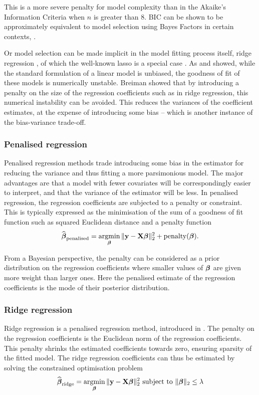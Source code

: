 \noindent This is a more severe penalty for model complexity than in the
Akaike's Information Criteria when $n$ is greater than $8$. BIC can be shown to
be approximately equivalent to model selection using Bayes Factors in certain
contexts, \cite{Kass1993}.

Or model selection can be made implicit in the model fitting process itself,
ridge regression \citep{Casella1980}, of which the well-known lasso is a special
case \citep{Tibshirani1996}. As \citep{Breiman1996} and \citep{Efron2013}
showed, while  the standard formulation of a linear model is unbiased, the
goodness of fit of these models is numerically  unstable. Breiman showed that by
introducing a penalty on the size of the regression coefficients such as  in
ridge regression, this numerical instability can be avoided. This reduces the
variances of the coefficient estimates, at the expense of introducing some bias
-- which is another instance of the bias-variance trade-off.

\subsubsection{Penalised regression}

Penalised regression methods trade introducing some bias in the estimator for
reducing the variance and thus fitting a more parsimonious model. The major
advantages are that a model with fewer covariates will be correspondingly easier
to interpret, and that the variance of the estimator will be less. In penalised
regression, the regression coefficients are subjected to a penalty or
constraint. This is typically expressed as the minimisation of the sum of a
goodness of fit function such as squared Euclidean distance and a penalty
function
$$
\widehat{\vbeta}_{\text{penalised}} = \argmin_\vbeta \|\vy - \mX \vbeta\|_2^2 + \text{penalty}(\vbeta).
$$

From a Bayesian perspective, the penalty can be considered as a prior
distribution on the regression coefficients where smaller values of ${\boldsymbol \beta}$ are
given more weight than larger ones. Here the penalised estimate of the
regression coefficients is the mode of their posterior distribution.

\subsubsection{Ridge regression}

Ridge regression is a penalised regression method, introduced in
\cite{Hoerl1970}. The penalty on the regression coefficients is the Euclidean
norm of the regression coefficients. This penalty shrinks the estimated
coefficients towards zero, ensuring sparsity of the fitted model. The ridge
regression coefficients can thus be estimated by solving the constrained
optimisation problem
$$
\widehat{\vbeta}_{\text{ridge}} = \argmin_\vbeta \|\vy - \mX \vbeta\|_2^2 \text{ subject to } \|\vbeta\|_2 \leq \lambda
$$

